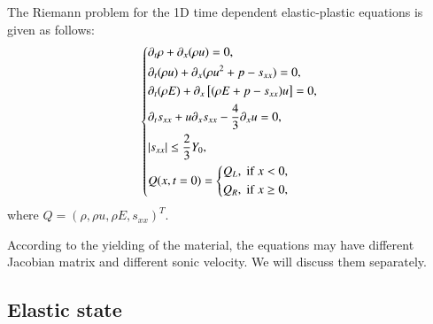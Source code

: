 \documentclass[review]{elsarticle}
\begin{document}
The Riemann problem for the 1D time dependent elastic-plastic equations is given as follows:
 \begin{equation}\label{eq:1d}
   \left\{ \begin{aligned}
       & \partial _t \rho +\partial_x(\rho u)=0,\\
       & \partial _t (\rho u)+\partial_x(\rho u^2 + p -s_{xx})=0,\\
       &\partial _t (\rho E)+\partial_x\left[(\rho E + p -s_{xx})u\right]=0,\\
       &\partial _t s_{xx}+u\partial_xs_{xx}-\frac{4}{3}\partial_x u=0,\\
& |s_{xx}|\leq \frac{2}{3}Y_{0}, \\
       &Q(x,t = 0) = \left\{\begin{aligned}
           Q_L, \hspace{0.1cm} \text{if} \hspace{0.1cm} x<0, \\
           Q_R, \hspace{0.1cm} \text{if} \hspace{0.1cm} x\ge 0, \\
       \end{aligned}\right.
     \end{aligned}
  \right.
\end{equation}
where $Q = (\rho, \rho u, \rho E, s_{xx})^T$.

According to the yielding of the material, the equations may have different Jacobian matrix and different sonic velocity. We will discuss them separately.
\subsection{Elastic state}
\end{document}
